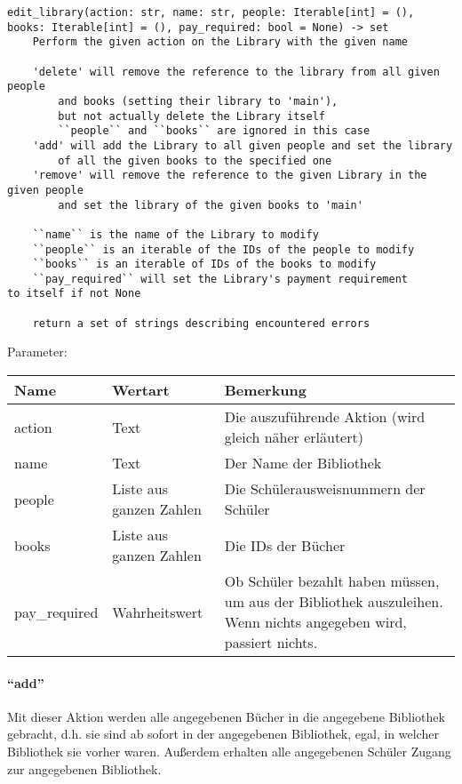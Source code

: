 \begin{verbatim}
edit_library(action: str, name: str, people: Iterable[int] = (),
books: Iterable[int] = (), pay_required: bool = None) -> set
    Perform the given action on the Library with the given name

    'delete' will remove the reference to the library from all given people
        and books (setting their library to 'main'),
        but not actually delete the Library itself
        ``people`` and ``books`` are ignored in this case
    'add' will add the Library to all given people and set the library
        of all the given books to the specified one
    'remove' will remove the reference to the given Library in the given people
        and set the library of the given books to 'main'

    ``name`` is the name of the Library to modify
    ``people`` is an iterable of the IDs of the people to modify
    ``books`` is an iterable of IDs of the books to modify
    ``pay_required`` will set the Library's payment requirement 
to itself if not None

    return a set of strings describing encountered errors
\end{verbatim}

Parameter:

\begin{tabular}{|p{}|p{}|p{}|}
Name & Wertart & Bemerkung\\
\hline
action & Text & Die auszuführende Aktion (wird gleich näher erläutert) \\
name & Text & Der Name der Bibliothek \\
people & Liste aus ganzen Zahlen & Die Schülerausweisnummern der Schüler \\
books & Liste aus ganzen Zahlen & Die IDs der Bücher \\
pay\_required & Wahrheitswert & Ob Schüler bezahlt haben müssen, um aus der Bibliothek auszuleihen. Wenn nichts angegeben wird, passiert nichts.
\end{tabular}

\paragraph{``add''}
Mit dieser Aktion werden alle angegebenen Bücher in die angegebene Bibliothek gebracht, d.h. sie sind ab sofort in der angegebenen Bibliothek, egal, in welcher Bibliothek sie vorher waren. Außerdem erhalten alle angegebenen Schüler Zugang zur angegebenen Bibliothek.

